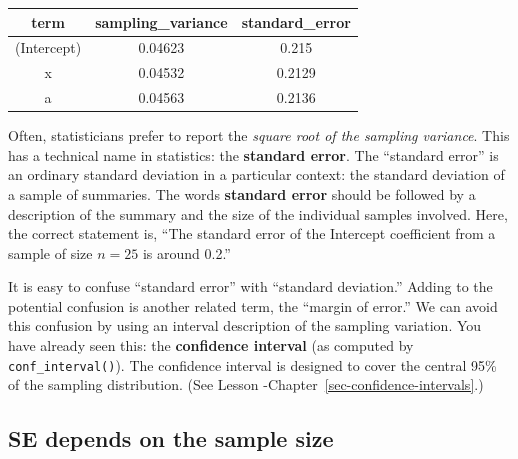 \documentclass[
  letterpaper,
  DIV=11,
  numbers=noendperiod,
  oneside]{scrartcl}
\begin{document}
\begin{longtable}[]{@{}ccc@{}}
\toprule\noalign{}
term & sampling\_variance & standard\_error \\
\midrule\noalign{}
\endhead
\bottomrule\noalign{}
\endlastfoot
(Intercept) & 0.04623 & 0.215 \\
x & 0.04532 & 0.2129 \\
a & 0.04563 & 0.2136 \\
\end{longtable}

Often, statisticians prefer to report the \emph{square root of the
sampling variance}. This has a technical name in statistics: the
\textbf{standard error}. The ``standard error'' is an ordinary standard
deviation in a particular context: the standard deviation of a sample of
summaries. The words \textbf{standard error} should be followed by a
description of the summary and the size of the individual samples
involved. Here, the correct statement is, ``The standard error of the
Intercept coefficient from a sample of size \(n=25\) is around 0.2.''

\begin{tcolorbox}[enhanced jigsaw, colbacktitle=quarto-callout-warning-color!10!white, opacityback=0, breakable, opacitybacktitle=0.6, colback=white, coltitle=black, arc=.35mm, title=\textcolor{quarto-callout-warning-color}{\faExclamationTriangle}\hspace{0.5em}{Confusion about ``standard'' and ``error''}, left=2mm, colframe=quarto-callout-warning-color-frame, rightrule=.15mm, bottomrule=.15mm, leftrule=.75mm, bottomtitle=1mm, toptitle=1mm, titlerule=0mm, toprule=.15mm]

It is easy to confuse ``standard error'' with ``standard deviation.''
Adding to the potential confusion is another related term, the ``margin
of error.'' We can avoid this confusion by using an interval description
of the sampling variation. You have already seen this: the
\textbf{confidence interval} (as computed by \texttt{conf\_interval()}).
The confidence interval is designed to cover the central 95\% of the
sampling distribution. (See Lesson
-Chapter~\ref{sec-confidence-intervals}.)

\end{tcolorbox}

\subsection{SE depends on the sample
size}\label{se-depends-on-the-sample-size}
\end{document}
